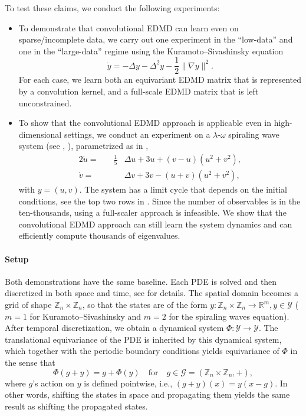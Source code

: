 \documentclass[preprint,12pt,authoryear]{elsarticle}
\newcommand{\Z}{\mathbb Z}
\newcommand{\R}{\mathbb{R}}
\newcommand\Gc{\mathcal G}
\newcommand\Yc{\mathcal Y}
\begin{document}
{To test these claims, we conduct the following experiments:
\begin{itemize}
    \item To demonstrate that convolutional EDMD can learn even on sparse/incomplete data, we carry out one experiment in the ``low-data'' and one in the ``large-data'' regime using the Kuramoto--Sivashinsky equation 
    $$
        \dot y = - \Delta y - \Delta^2 y - \textstyle\frac 1 2  \lVert \nabla y \rVert^2.
    $$
    For each case, we learn both an equivariant EDMD matrix that is represented by a convolution kernel, and a full-scale EDMD matrix that is left unconstrained. 
    \item To show that the convolutional EDMD approach is applicable even in high-dimensional settings, we conduct an experiment on a $\lambda$-$\omega$ spiraling wave system (see \cite{aguareles2016asymptotic}, \cite{nathan2018applied}), parametrized as in \cite{walker2023visualpde},
    \begin{alignat*}{2}
        \dot u = &\quad\textstyle \frac 1 5 &\Delta u + 3 u + (v - u)(u^2 +v^2), \\
        \dot v = &&\Delta v + 3 v - (u+v)(u^2+ v^2) ,
    \end{alignat*}
    with $y = (u,v)$.
    The system has a limit cycle that depends on the initial conditions, see the top two rows in . Since the number of observables is in the ten-thousands, using a full-scaler approach is infeasible. We show that the convolutional EDMD approach can still learn the system dynamics and can efficiently compute thousands of eigenvalues.
\end{itemize}

\paragraph{Setup}
Both demonstrations have the same baseline. Each PDE is solved and then discretized in both space and time, see  for details. The spatial domain becomes a grid of shape $\Z_n \times \Z_n$, so that the states are of the form $y : \Z_n \times \Z_n \rightarrow \R^m, y \in \Yc$ ($m=1$ for Kuramoto--Sivashinsky and $m = 2$ for the spiraling waves equation). 
After temporal discretization, we obtain a dynamical system $\Phi : \Yc \rightarrow \Yc$. The translational equivariance of the PDE is inherited by this dynamical system, which together with the periodic boundary conditions yields equivariance of $\Phi$ in the sense that 
$$
    \Phi(g + y) = g + \Phi(y) \quad\text{for}\quad g \in \Gc = (\Z_n \times \Z_n, +), 
$$
where $g$'s action on $y$ is defined pointwise, i.e., $(g + y)(x) = y(x - g)$. In other words, shifting the states in space and propagating them yields the same result as shifting the propagated states.

}
\end{document}
